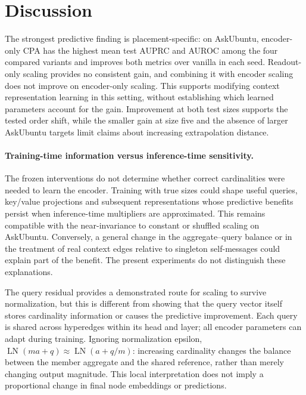 \documentclass{article}
\begin{document}
\section{Discussion}
The strongest predictive finding is placement-specific: on AskUbuntu, encoder-only CPA has the highest mean test AUPRC and AUROC among the four compared variants and improves both metrics over vanilla in each seed. Readout-only scaling provides no consistent gain, and combining it with encoder scaling does not improve on encoder-only scaling. This supports modifying context representation learning in this setting, without establishing which learned parameters account for the gain. Improvement at both test sizes supports the tested order shift, while the smaller gain at size five and the absence of larger AskUbuntu targets limit claims about increasing extrapolation distance.

\paragraph{Training-time information versus inference-time sensitivity.}
The frozen interventions do not determine whether correct cardinalities were needed to learn the encoder. Training with true sizes could shape useful queries, key/value projections and subsequent representations whose predictive benefits persist when inference-time multipliers are approximated. This remains compatible with the near-invariance to constant or shuffled scaling on AskUbuntu. Conversely, a general change in the aggregate--query balance or in the treatment of real context edges relative to singleton self-messages could explain part of the benefit. The present experiments do not distinguish these explanations.

The query residual provides a demonstrated route for scaling to survive normalization, but this is different from showing that the query vector itself stores cardinality information or causes the predictive improvement. Each query is shared across hyperedges within its head and layer; all encoder parameters can adapt during training. Ignoring normalization epsilon, $\operatorname{LN}(ma+q)\approx\operatorname{LN}(a+q/m)$: increasing cardinality changes the balance between the member aggregate and the shared reference, rather than merely changing output magnitude. This local interpretation does not imply a proportional change in final node embeddings or predictions.
\end{document}
